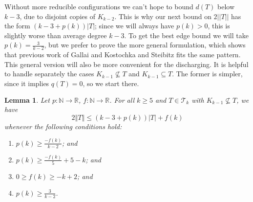\documentclass[12pt]{article}
\theoremstyle{plain}
\newtheorem{lem}[thm]{Lemma}
\theoremstyle{definition}
\theoremstyle{remark}
\newcommand{\fancy}[1]{\mathcal{#1}}
\newcommand{\IN}{\mathbb{N}}
\newcommand{\IR}{\mathbb{R}}
\newcommand{\T}{\fancy{T}}
\newcommand{\card}[1]{\left|#1\right|}
\newcommand{\size}[1]{\left\Vert#1\right\Vert}
\newcommand{\func}[3]{#1\colon #2 \rightarrow #3}
\begin{document}
Without more reducible configurations we can't hope to bound $d(T)$ below
$k-3$, due to disjoint copies of $K_{k-2}$.  This is why our next bound on $2||T||$ has the form
$(k-3 + p(k))|T|$; since we will always have $p(k)>0$, this is slightly worse than average degree $k-3$.
To get the best edge bound we will take $p(k)=\frac3{k-2}$,
but we prefer to prove the more general formulation, which shows that previous work of Gallai and Kostochka and
Steibitz fits the same pattern.  This general version will also be more convenient for the discharging.
%
It is helpful to handle separately the cases $K_{k-1}\not\subseteq T$ and
$K_{k-1}\subseteq T$.  The former is simpler, since it implies $q(T)=0$, so we
start there.

\begin{lem}\label{BoundFamilyWithoutKKMinusOne}
	Let $\func{p}{\IN}{\IR}$, $\func{f}{\IN}{\IR}$.
	For all $k \ge 5$ and $T \in \T_k$ with $K_{k-1} \not \subseteq T$, we have
	\[2\size{T} \le (k-3 + p(k))\card{T} + f(k)\]
	whenever the following conditions hold:
	\begin{enumerate}
		\item $p(k) \ge \frac{-f(k)}{k-2}$; and
		\item $p(k) \ge \frac{-f(k)}{5} + 5 - k$; and
		\item $0\ge f(k)\ge -k+2$; and
		\item $p(k) \ge \frac{3}{k-2}$.
	\end{enumerate}
\end{lem}
\end{document}
